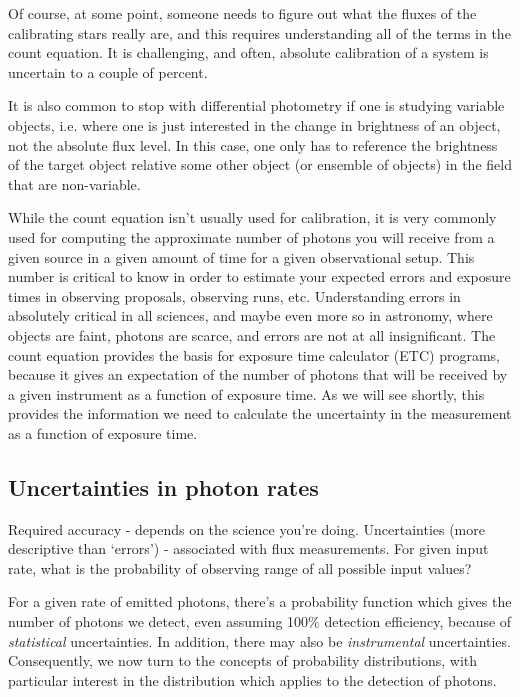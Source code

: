 \documentclass[12pt]{article}
\begin{document}
Of course, at some point, someone needs to figure out what
the fluxes of the calibrating stars really are, and this requires
understanding all of the terms in the count equation. It is
challenging, and often, absolute calibration of a system is uncertain
to a couple of percent.

It is also common to stop with differential photometry if
one is studying variable objects, i.e. where one is just interested in
the change in brightness of an object, not the absolute flux level. In
this case, one only has to reference the brightness of the target
object relative some other object (or ensemble of objects) in the
field that are non-variable.

While the count equation isn't usually used for calibration,
it is very commonly used for computing the approximate number of
photons you will receive from a given source in a given amount of time
for a given observational setup. This number is critical to know in
order to estimate your expected errors and exposure times in observing
proposals, observing runs, etc. Understanding errors in absolutely
critical in all sciences, and maybe even more so in astronomy, where
objects are faint, photons are scarce, and errors are not at all
insignificant. The count equation provides the basis for exposure time
calculator (ETC) programs, because it gives an expectation of the
number of photons that will be received by a given instrument as a
function of exposure time. As we will see shortly, this provides the
information we need to calculate the uncertainty in the measurement as
a function of exposure time.


\subsection*{Uncertainties in photon rates}
\textcolor{myBlue}{
Required accuracy - depends on the science you're doing.
Uncertainties (more descriptive than `errors') -
associated with flux measurements.
For given input rate, what is the probability of observing
range of all possible input values?
}

For a given rate of emitted photons, there's a probability function
which gives the number of photons we detect, even assuming 100\%
detection efficiency, because of \emph{statistical} uncertainties. In
addition, there may also be \emph{instrumental} uncertainties. Consequently,
we now turn to the concepts of probability distributions, with
particular interest in the distribution which applies to the detection
of photons.
\end{document}
